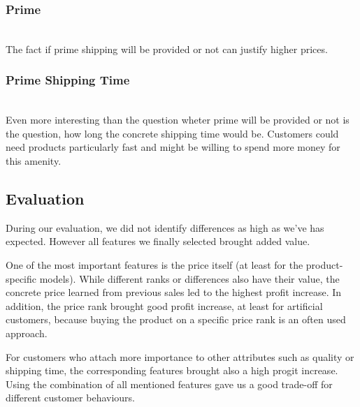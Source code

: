 	\subsubsection{Prime}
		~\\
		The fact if prime shipping will be provided or not can justify higher prices.
	\subsubsection{Prime Shipping Time}
		~\\
		Even more interesting than the question wheter prime will be provided or not is the question, how long the concrete shipping time would be. Customers could need products particularly fast and might be willing to spend more money for this amenity.
\subsection{Evaluation}
	During our evaluation, we did not identify differences as high as we've has expected. However all features we finally selected brought added value.

	One of the most important features is the price itself (at least for the product-specific models). While different ranks or differences also have their value, the concrete price learned from previous sales led to the highest profit increase. In addition, the price rank brought good profit increase, at least for artificial customers, because buying the product on a specific price rank is an often used approach.

	For customers who attach more importance to other attributes such as quality or shipping time, the corresponding features brought also a high progit increase. Using the combination of all mentioned features gave us a good trade-off for different customer behaviours.
